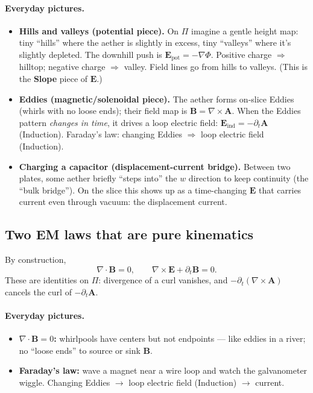\paragraph{Everyday pictures.}
\begin{itemize}
  \item \textbf{Hills and valleys (potential piece).} On $\Pi$ imagine a gentle height map: tiny ``hills'' where the aether is slightly in excess, tiny ``valleys'' where it's slightly depleted. The downhill push is $\mathbf E_{\text{pot}}=-\nabla\Phi$. Positive charge $\Rightarrow$ hilltop; negative charge $\Rightarrow$ valley. Field lines go from hills to valleys. (This is the \textbf{Slope} piece of $\mathbf E$.)
  \item \textbf{Eddies (magnetic/solenoidal piece).} The aether forms on-slice Eddies (whirls with no loose ends); their field map is $\mathbf B=\nabla\times\mathbf A$. When the Eddies pattern \emph{changes in time}, it drives a loop electric field: $\mathbf E_{\text{ind}}=-\partial_t\mathbf A$ (Induction). Faraday's law: changing Eddies $\Rightarrow$ loop electric field (Induction).
  \item \textbf{Charging a capacitor (displacement-current bridge).} Between two plates, some aether briefly ``steps into'' the $w$ direction to keep continuity (the “bulk bridge”). On the slice this shows up as a time-changing $\mathbf E$ that carries current even through vacuum: the displacement current.
\end{itemize}

\subsection{Two EM laws that are pure kinematics}
By construction,
\begin{equation}
\nabla\!\cdot\!\mathbf B = 0,
\qquad
\nabla\times\mathbf E + \partial_t \mathbf B = 0.
\label{eq:homogeneous}
\end{equation}
These are identities on $\Pi$: divergence of a curl vanishes, and $-\partial_t(\nabla\times\mathbf A)$ cancels the curl of $-\partial_t\mathbf A$. 

\paragraph{Everyday pictures.}
\begin{itemize}
  \item \textbf{$\nabla\!\cdot\!\mathbf B=0$:} whirlpools have centers but not endpoints --- like eddies in a river; no ``loose ends'' to source or sink $\mathbf B$.
  \item \textbf{Faraday's law:} wave a magnet near a wire loop and watch the galvanometer wiggle. Changing Eddies $\to$ loop electric field (Induction) $\to$ current.
\end{itemize}

